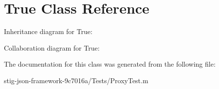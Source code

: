 \hypertarget{interface_true}{
\section{\-True \-Class \-Reference}
\label{interface_true}
}


\-Inheritance diagram for \-True\-:


\-Collaboration diagram for \-True\-:


\-The documentation for this class was generated from the following file\-:\begin{DoxyCompactItemize}
\item 
stig-\/json-\/framework-\/9c7016a/\-Tests/\-Proxy\-Test.\-m\end{DoxyCompactItemize}
